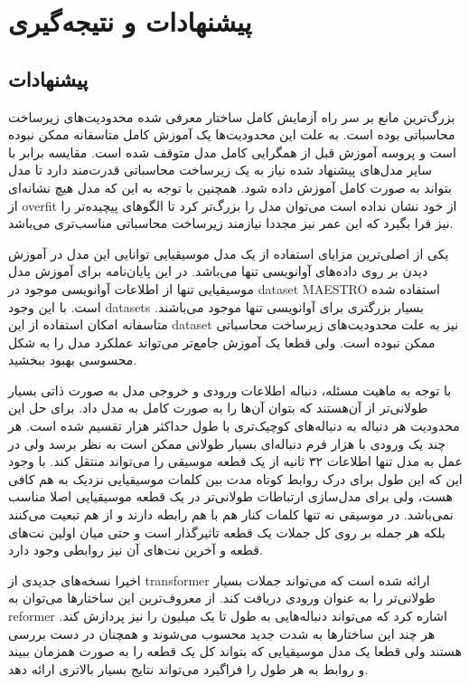 \chapter{پیشنهادات و نتیجه‌گیری}
\section{پیشنهادات}
بزرگ‌ترین مانع بر سر راه آزمایش کامل ساختار معرفی شده محدودیت‌های زیرساخت
محاسباتی بوده است. به علت این محدودیت‌ها یک آموزش کامل متاسفانه ممکن نبوده است و
پروسه آموزش قبل از همگرایی کامل مدل متوقف شده است. مقایسه برابر با سایر مدل‌های
پیشنهاد شده نیاز به یک زیرساخت محاسباتی قدرت‌مند دارد تا مدل بتواند به صورت کامل
آموزش داده شود. همچنین با توجه به این که مدل هیچ نشانه‌ای از \gls{overfit} از
خود نشان نداده است می‌توان مدل را بزرگ‌تر کرد تا الگوهای پیچیده‌تر را نیز فرا
بگیرد که این عمر نیز مجددا نیازمند زیرساخت محاسباتی مناسب‌تری می‌باشد.

یکی از اصلی‌ترین مزایای استفاده از یک مدل موسیقیایی توانایی این مدل در آموزش
دیدن بر روی داده‌های آوانویسی تنها می‌باشد. در این پایان‌نامه برای آموزش مدل
موسیقیایی تنها از اطلاعات آوانویسی موجود در \gls{dataset} MAESTRO استفاده شده
است. با این وجود \glspl{dataset} بسیار بزرگتری برای آوانویسی تنها موجود
می‌باشند. متاسفانه امکان استفاده از این \gls{dataset} نیز به علت محدودیت‌های
زیرساخت محاسباتی ممکن نبوده است. ولی قطعا یک آموزش جامع‌تر می‌تواند عملکرد مدل
را به شکل محسوسی بهبود ببخشید.

با توجه به ماهیت مسئله، دنباله اطلاعات ورودی و خروجی مدل به صورت ذاتی بسیار
طولانی‌تر از آن‌هستند که بتوان آن‌ها را به صورت کامل به مدل داد. برای حل این
محدودیت هر دنباله به دنباله‌های کوچیک‌تری با طول حداکثر هزار تقسیم شده است. هر
چند یک ورودی با هزار فرم دنباله‌ای بسیار طولانی ممکن است به نظر برسد ولی در عمل
به مدل تنها اطلاعات ۳۲ ثانیه از یک قطعه موسیقی را می‌تواند منتقل کند. با وجود
این که این طول برای درک روابط کوتاه مدت بین کلمات موسیقیایی نزدیک به هم کافی
هست، ولی برای مدل‌سازی ارتباطات طولانی‌تر در یک قطعه موسیقیایی اصلا مناسب
نمی‌باشد. در موسیقی نه تنها کلمات کنار هم با هم رابطه دارند و از هم تبعیت
می‌کنند بلکه هر جمله بر روی کل جملات یک قطعه تاثیرگذار است و حتی میان اولین
نت‌های قطعه و آخرین نت‌های آن نیز روابطی وجود دارد.

اخیرا نسخه‌های جدیدی از \gls{transformer} ارائه شده است که می‌تواند جملات بسیار
طولانی‌تر را به عنوان ورودی دریافت کند. از معروف‌ترین این ساختارها می‌توان به
reformer \cite{kitaev2020reformer} اشاره کرد که می‌تواند دنباله‌هایی به طول تا
یک میلیون را نیز پردازش کند. هر چند این ساختارها به شدت جدید محسوب می‌شوند و
همچنان در دست بررسی هستند ولی قطعا یک مدل موسیقیایی که بتواند کل یک قطعه را به
صورت همزمان ببیند و روابط به هر طول را فراگیرد می‌تواند نتایج بسیار بالاتری
ارائه دهد.

